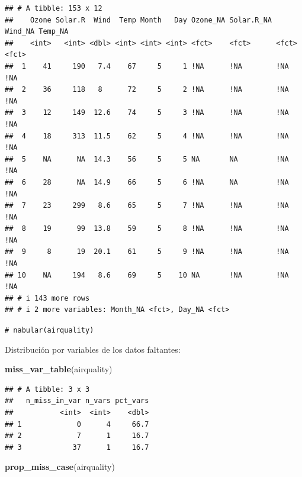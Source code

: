 \documentclass[
]{book}
\newenvironment{Shaded}{\begin{snugshade}}{\end{snugshade}}
\newcommand{\CommentTok}[1]{\textcolor[rgb]{0.56,0.35,0.01}{\textit{#1}}}
\newcommand{\FunctionTok}[1]{\textcolor[rgb]{0.13,0.29,0.53}{\textbf{#1}}}
\newcommand{\NormalTok}[1]{#1}
\theoremstyle{break}
\theoremstyle{nonumberplain}
\renewcommand{\CommentTok}[1]{\textcolor[rgb]{0.41,0.41,0.41}{\texttt{#1}}}
\begin{document}
\begin{verbatim}
## # A tibble: 153 x 12
##    Ozone Solar.R  Wind  Temp Month   Day Ozone_NA Solar.R_NA Wind_NA Temp_NA
##    <int>   <int> <dbl> <int> <int> <int> <fct>    <fct>      <fct>   <fct>  
##  1    41     190   7.4    67     5     1 !NA      !NA        !NA     !NA    
##  2    36     118   8      72     5     2 !NA      !NA        !NA     !NA    
##  3    12     149  12.6    74     5     3 !NA      !NA        !NA     !NA    
##  4    18     313  11.5    62     5     4 !NA      !NA        !NA     !NA    
##  5    NA      NA  14.3    56     5     5 NA       NA         !NA     !NA    
##  6    28      NA  14.9    66     5     6 !NA      NA         !NA     !NA    
##  7    23     299   8.6    65     5     7 !NA      !NA        !NA     !NA    
##  8    19      99  13.8    59     5     8 !NA      !NA        !NA     !NA    
##  9     8      19  20.1    61     5     9 !NA      !NA        !NA     !NA    
## 10    NA     194   8.6    69     5    10 NA       !NA        !NA     !NA    
## # i 143 more rows
## # i 2 more variables: Month_NA <fct>, Day_NA <fct>
\end{verbatim}

\begin{Shaded}
\begin{Highlighting}[]
\CommentTok{\# nabular(airquality)}
\end{Highlighting}
\end{Shaded}

Distribución por variables de los datos faltantes:

\begin{Shaded}
\begin{Highlighting}[]
\FunctionTok{miss\_var\_table}\NormalTok{(airquality) }
\end{Highlighting}
\end{Shaded}

\begin{verbatim}
## # A tibble: 3 x 3
##   n_miss_in_var n_vars pct_vars
##           <int>  <int>    <dbl>
## 1             0      4     66.7
## 2             7      1     16.7
## 3            37      1     16.7
\end{verbatim}

\begin{Shaded}
\begin{Highlighting}[]
\FunctionTok{prop\_miss\_case}\NormalTok{(airquality)}
\end{Highlighting}
\end{Shaded}
\end{document}

